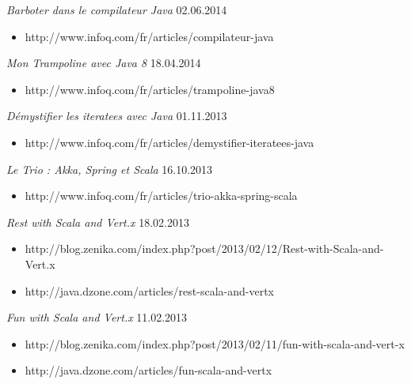 \documentclass{res}
\begin{document}
\begin{resume}
{{\sl Barboter dans le compilateur Java}  \hfill    02.06.2014	\\
\vspace{-5mm}
\begin{itemize}
 \item[]  \scriptsize http://www.infoq.com/fr/articles/compilateur-java
\end{itemize}
\vspace{-2mm}

{\sl Mon Trampoline avec Java 8}  \hfill    18.04.2014	\\
\vspace{-5mm}
\begin{itemize}
 \item[]  \scriptsize http://www.infoq.com/fr/articles/trampoline-java8
\end{itemize}
\vspace{-2mm}

{\sl Démystifier les iteratees avec Java}  \hfill    01.11.2013	\\
\vspace{-5mm}
\begin{itemize}
 \item[]  \scriptsize http://www.infoq.com/fr/articles/demystifier-iteratees-java
\end{itemize}
\vspace{-2mm}

{\sl Le Trio : Akka, Spring et Scala}  \hfill    16.10.2013	\\
\vspace{-5mm}  \begin{itemize}
 \item[]  \scriptsize http://www.infoq.com/fr/articles/trio-akka-spring-scala
\end{itemize}
\vspace{-2mm}

{\sl Rest with Scala and Vert.x}  \hfill    18.02.2013	\\
\vspace{-5mm}  \begin{itemize}
\item[]  \scriptsize http://blog.zenika.com/index.php?post/2013/02/12/Rest-with-Scala-and-Vert.x
\vspace{-2mm}
\item[]  \scriptsize http://java.dzone.com/articles/rest-scala-and-vertx
\end{itemize}
\vspace{-2mm}

{\sl Fun with Scala and Vert.x}  \hfill    11.02.2013	\\
\vspace{-5mm}  \begin{itemize}
\item[]  \scriptsize http://blog.zenika.com/index.php?post/2013/02/11/fun-with-scala-and-vert-x
\vspace{-2mm}
\item[]  \scriptsize http://java.dzone.com/articles/fun-scala-and-vertx
\end{itemize}
\vspace{-2mm}

}
\end{resume}
\end{document}
